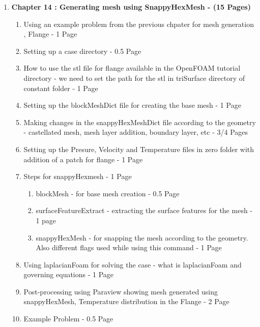\documentclass[12pt]{article}
\begin{document}
\begin{enumerate}
\item \textbf{Chapter 14 : Generating mesh using SnappyHexMesh - (15 Pages)}
\begin{enumerate}[label*=\arabic*.]
\item Using an example problem from the previous chpater for mesh generation , Flange  - 1 Page 
\item Setting up a case directory - 0.5 Page
\item How to use the stl file for flange available in the OpenFOAM tutorial directory - we need to set the path for the stl in triSurface directory of constant folder - 1 Page
\item Setting up the blockMeshDict file for creating the base mesh - 1 Page
\item Making changes in the snappyHexMeshDict file according to the geometry - castellated mesh, mesh layer addition, boundary layer, etc - 3/4 Pages
\item Setting up the Presure, Velocity and Temperature files in zero folder with addition of a patch for flange - 1 Page
\item Steps for snappyHexmesh - 1 Page 
\begin{enumerate}[label*=\arabic*.]
\item blockMesh - for base mesh creation - 0.5 Page
\item surfaceFeatureExtract - extracting the surface features for the mesh - 1 page
\item snappyHexMesh - for snapping the mesh according to the geometry. Also different flags used while using this command - 1 Page
\end{enumerate}
\item Using laplacianFoam for solving the case -  what is laplacianFoam and governing equations - 1 Page
\item Post-processing using Paraview showing mesh generated using snappyHexMesh, Temperature distribution in the Flange - 2 Page  
\item Example Problem - 0.5 Page
\end{enumerate}



\end{enumerate}
\end{document}
